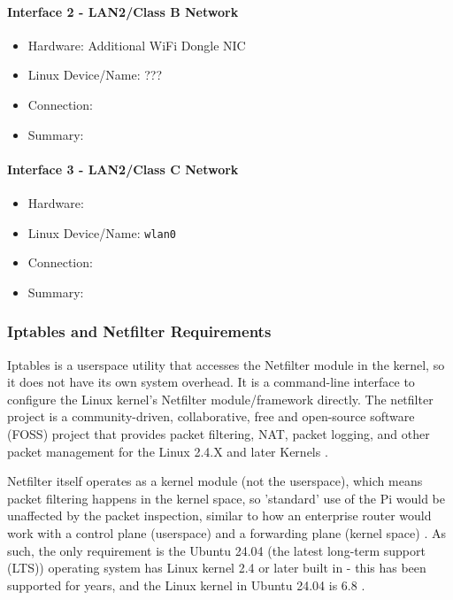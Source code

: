 \paragraph{Interface 2 - LAN2/Class B Network}
\begin{itemize}
    \item Hardware: Additional WiFi Dongle NIC
    \item Linux Device/Name: ???
    \item Connection:
    \item Summary: 
\end{itemize}

\paragraph{Interface 3 - LAN2/Class C Network}
\begin{itemize}
    \item Hardware:
    \item Linux Device/Name: \verb|wlan0|
    \item Connection:
    \item Summary: 
\end{itemize}










\subsubsection{Iptables and Netfilter Requirements}
Iptables is a userspace utility that accesses the Netfilter module in the kernel, so it does not have its own system overhead. It is a command-line interface to configure the Linux kernel's Netfilter module/framework directly. The netfilter project is a community-driven, collaborative, free and open-source software (FOSS) project that provides packet filtering, NAT, packet logging, and other packet management for the Linux 2.4.X and later Kernels \parencite{Netfilter2024Official}.

Netfilter itself operates as a kernel module (not the userspace), which means packet filtering happens in the kernel space, so 'standard' use of the Pi would be unaffected by the packet inspection, similar to how an enterprise router would work with a control plane (userspace) and a forwarding plane (kernel space) \parencite{Cloudflare2024ControlPlane}. As such, the only requirement is the Ubuntu 24.04 (the latest long-term support (LTS)) operating system has Linux kernel 2.4 or later built in - this has been supported for years, and the Linux kernel in Ubuntu 24.04 is 6.8 \parencite{Ubuntu2024KernelLifecycle}.